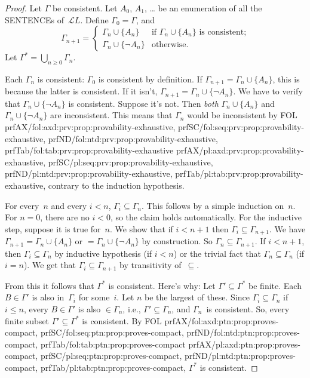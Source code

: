 \documentclass[10pt,a4paper]{article}
\newcommand*{\olup}[1]{\MakeUppercase{#1}}
\theoremstyle{plain}
\theoremstyle{definition}
\theoremstyle{remark}
\providecommand{\Lang}{\ensuremath{\mathcal{L}}}
\providecommand{\iftag}[1]{#1}
\providecommand{\tagrefs}[1]{#1}
\providecommand{\iftag}{}
\providecommand{\tagrefs}[1]{}
\begin{document}
\begin{proof}
Let $\Gamma$ be consistent.  Let $A_0$, $A_1$,
\dots{} be an enumeration of all the \olup{sentence}s of~$\Lang L$.
Define $\Gamma_0 = \Gamma$, and
\[
\Gamma_{n+1} =
\begin{cases}
\Gamma_n \cup \{ A_n \} & \textrm{if $\Gamma_n \cup \{A_n\}$ is
  consistent;} \\
\Gamma_n \cup \{ \lnot A_n \} & \textrm{otherwise.}
\end{cases}
\]
Let $\Gamma^* = \bigcup_{n \geq 0} \Gamma_n$.

Each $\Gamma_n$ is consistent: $\Gamma_0$ is consistent by definition.
If $\Gamma_{n+1} = \Gamma_n \cup \{A_n\}$, this is because the latter
is consistent.  If it isn't, $\Gamma_{n+1} = \Gamma_n \cup \{\lnot
A_n\}$. We have to verify that $\Gamma_n \cup \{\lnot A_n\}$ is
consistent. Suppose it's not. Then \emph{both} $\Gamma_n \cup
\{A_n\}$ and $\Gamma_n \cup \{\lnot A_n\}$ are inconsistent.  This
means that $\Gamma_n$ would be inconsistent by
\iftag{FOL}{%
  \tagrefs{prfAX/{fol:axd:prv:prop:provability-exhaustive},
    prfSC/{fol:seq:prv:prop:provability-exhaustive},
    prfND/{fol:ntd:prv:prop:provability-exhaustive},
    prfTab/{fol:tab:prv:prop:provability-exhaustive}}}{%
  \tagrefs{prfAX/{pl:axd:prv:prop:provability-exhaustive},
    prfSC/{pl:seq:prv:prop:provability-exhaustive},
    prfND/{pl:ntd:prv:prop:provability-exhaustive},
    prfTab/{pl:tab:prv:prop:provability-exhaustive}}},
contrary to the induction hypothesis.

For every~$n$ and every $i < n$, $\Gamma_i \subseteq \Gamma_n$. This
follows by a simple induction on~$n$. For $n=0$, there are no $i < 0$,
so the claim holds automatically.  For the inductive step, suppose it
is true for~$n$. We show that if $i < n+1$ then $\Gamma_i \subseteq
\Gamma_{n+1}$. We have $\Gamma_{n+1} = \Gamma_n \cup \{A_n\}$ or $=
\Gamma_n \cup \{\lnot A_n\}$ by construction. So $\Gamma_n \subseteq
\Gamma_{n+1}$. If $i < n+1$, then $\Gamma_i \subseteq \Gamma_n$ by
inductive hypothesis (if $i < n$) or the trivial fact that $\Gamma_n
\subseteq \Gamma_n$ (if $i = n$). We get that $\Gamma_i \subseteq
\Gamma_{n+1}$ by transitivity of~$\subseteq$.

From this it follows that $\Gamma^*$ is consistent. Here's why: Let
$\Gamma' \subseteq \Gamma^*$ be finite. Each $B \in \Gamma'$ is also
in~$\Gamma_i$ for some~$i$. Let $n$ be the largest of these. Since
$\Gamma_i \subseteq \Gamma_n$ if $i \le n$, every $B \in \Gamma'$ is
also $\in \Gamma_n$, i.e., $\Gamma' \subseteq \Gamma_n$, and
$\Gamma_n$~is consistent. So, every finite subset $\Gamma' \subseteq
\Gamma^*$ is consistent. By \iftag{FOL}{%
  \tagrefs{prfAX/{fol:axd:ptn:prop:proves-compact},
    prfSC/{fol:seq:ptn:prop:proves-compact},
    prfND/{fol:ntd:ptn:prop:proves-compact},
    prfTab/{fol:tab:ptn:prop:proves-compact}}}{%
  \tagrefs{prfAX/{pl:axd:ptn:prop:proves-compact},
    prfSC/{pl:seq:ptn:prop:proves-compact},
    prfND/{pl:ntd:ptn:prop:proves-compact},
    prfTab/{pl:tab:ptn:prop:proves-compact}}}, $\Gamma^*$ is
  consistent.


\end{proof}
\end{document}
